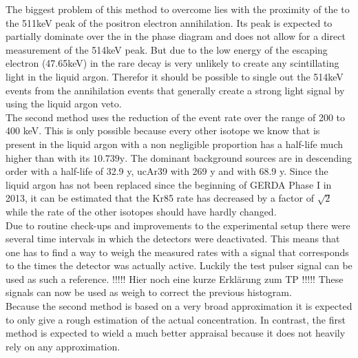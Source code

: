 The biggest problem of this method to overcome lies with the proximity of the  to the 511keV peak of the positron electron annihilation. 
Its peak is expected to partially dominate over the  in the phase diagram and does not allow for a direct measurement of the 514keV peak. 
But due to the low energy of the escaping electron (47.65keV) in the rare decay is very unlikely to create any scintillating light in the liquid argon. 
Therefor it should be possible to single out the 514keV events from the annihilation events that generally create a strong light signal by using the liquid argon veto.
\\

The second method uses the reduction of the event rate over the range of 200 to 400 keV. 
This is only possible because every other isotope we know that is present in the liquid argon with a non negligible proportion has a half-life much higher than  with its \(10.739\mathrm{y}\). 
The dominant background sources are in descending order  with a half-life of 32.9 y, \n uc{Ar}{39} with 269 y and  with 68.9 y. 
Since the liquid argon has not been replaced since the beginning of GERDA Phase I in 2013, it can be estimated that the Kr85 rate has decreased by a factor of \(\sqrt{2}\) while the rate of the other isotopes should have hardly changed.
\\

Due to routine check-ups and improvements to the experimental setup there were several time intervals in which the detectors were deactivated. 
This means that one has to find a way to weigh the measured rates with a signal that corresponds to the times the detector was actually active. 
Luckily the test pulser signal can be used as such a reference. 
!!!!! Hier noch eine kurze Erklärung zum TP !!!!!
These signals can now be used as weigh to correct the previous histogram.
\\

Because the second method is based on a very broad approximation it is expected to only give a rough estimation of the actual concentration. 
In contrast, the first method is expected to wield a much better appraisal because it does not heavily rely on any approximation.
\\

